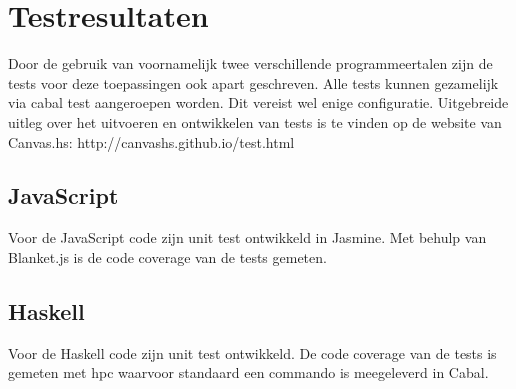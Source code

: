 \section{Testresultaten} \label{sec:testresultaten}

Door de gebruik van voornamelijk twee verschillende programmeertalen zijn de tests voor deze toepassingen ook apart geschreven. Alle tests kunnen gezamelijk via cabal test aangeroepen worden. Dit vereist wel enige configuratie. Uitgebreide uitleg over het uitvoeren en ontwikkelen van tests is te vinden op de website van Canvas.hs: http://canvashs.github.io/test.html

\subsection{JavaScript}
Voor de JavaScript code zijn unit test ontwikkeld in Jasmine. Met behulp van Blanket.js is de code coverage van de tests gemeten.

\subsection{Haskell}
Voor de Haskell code zijn unit test ontwikkeld. De code coverage van de tests is gemeten met hpc waarvoor standaard een commando is meegeleverd in Cabal.